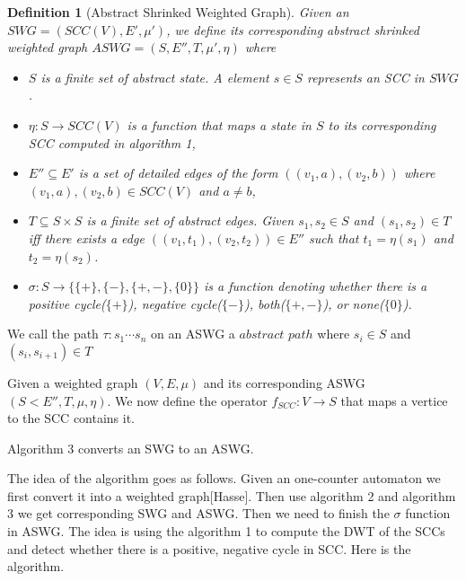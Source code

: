 \documentclass{article}
\newtheorem{definition}{Definition}
\begin{document}
\begin{definition}[Abstract Shrinked Weighted Graph]
	Given an $SWG = (SCC(V), E', \mu') $, we define its corresponding abstract shrinked weighted graph $ASWG = (S, E'', T, \mu', \eta)$ where 
\begin{itemize}
\item $S$ is a finite set of abstract state. A element  $s\in S$ represents an SCC in $SWG$.
\item $\eta: S\rightarrow SCC(V)$ is a function that maps a state in $S$ to its corresponding SCC computed in algorithm 1,
\item $E'' \subseteq E'$ is a set of detailed edges of the form $((v_1,a), (v_2, b))$ where $(v_1, a), (v_2, b)\in SCC(V)$ and $a \ne b$,
\item $T\subseteq S \times S$ is a finite set of abstract edges. Given $s_1, s_2\in S$ and $(s_1, s_2)\in T$ iff there exists a edge $((v_1,t_1), (v_2, t_2))\in E''$ such that $t_1 = \eta(s_1)$ and $t_2 = \eta(s_2)$. 
\item $\sigma: S\rightarrow \{\{+\}, \{-\}, \{+,-\}, \{0\}\}$ is a function denoting whether there is a positive cycle($\{+\}$), negative cycle($\{-\}$), both($\{+,-\}$), or none($\{0\}$).

 
\end{itemize}
\end{definition}

We call the path $\tau: s_1\cdots s_n$ on an ASWG a $abstract $ $path$ where $s_i\in S$ and $(s_i, s_{i+1})\in T$

Given a weighted graph $(V,E,\mu)$ and its corresponding ASWG $(S<E'',T,\mu,\eta)$. We now define the operator $f_{SCC}: V\rightarrow S$ that maps a vertice to the SCC contains it. 

Algorithm 3 converts an SWG to an ASWG.

The idea of the algorithm goes as follows. Given an one-counter automaton we first convert it into a weighted graph[Hasse]. Then use algorithm 2 and algorithm 3 we get corresponding SWG and ASWG. Then we need to finish the $\sigma$ function in ASWG. The idea is using the algorithm 1 to compute the DWT of the SCCs and detect whether there is a positive, negative cycle in SCC. Here is the algorithm.
\end{document}
